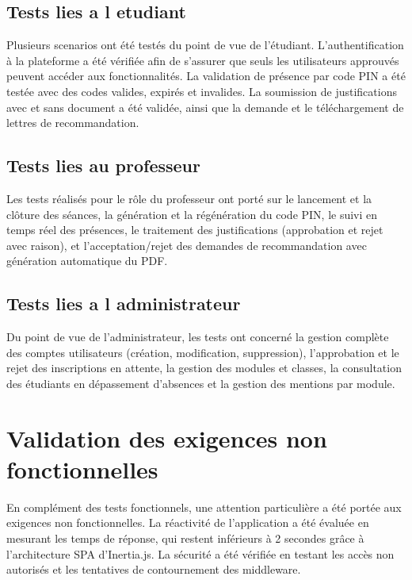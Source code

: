 \documentclass[12pt, a4paper, openright]{report}
\begin{document}
\subsection{Tests lies a l etudiant}

Plusieurs scenarios ont été testés du point de vue de l'étudiant. L'authentification à la plateforme a été vérifiée afin de s'assurer que seuls les utilisateurs approuvés peuvent accéder aux fonctionnalités. La validation de présence par code PIN a été testée avec des codes valides, expirés et invalides. La soumission de justifications avec et sans document a été validée, ainsi que la demande et le téléchargement de lettres de recommandation.

\subsection{Tests lies au professeur}

Les tests réalisés pour le rôle du professeur ont porté sur le lancement et la clôture des séances, la génération et la régénération du code PIN, le suivi en temps réel des présences, le traitement des justifications (approbation et rejet avec raison), et l'acceptation/rejet des demandes de recommandation avec génération automatique du PDF.

\subsection{Tests lies a l administrateur}

Du point de vue de l'administrateur, les tests ont concerné la gestion complète des comptes utilisateurs (création, modification, suppression), l'approbation et le rejet des inscriptions en attente, la gestion des modules et classes, la consultation des étudiants en dépassement d'absences et la gestion des mentions par module.

\section{Validation des exigences non fonctionnelles}

En complément des tests fonctionnels, une attention particulière a été portée aux exigences non fonctionnelles. La réactivité de l'application a été évaluée en mesurant les temps de réponse, qui restent inférieurs à 2 secondes grâce à l'architecture SPA d'Inertia.js. La sécurité a été vérifiée en testant les accès non autorisés et les tentatives de contournement des middleware.
\end{document}
